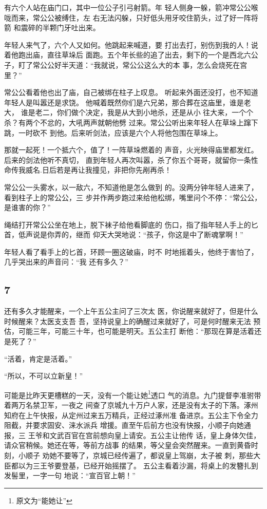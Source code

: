 有六个人站在庙门口，其中一位公子引弓射箭。年
轻人侧身一躲，箭冲常公公喉咙而来，常公公被缚住，左
右无法闪躲，只好低头用牙咬住箭头，过了好一阵将箭
和震碎的半颗门牙吐出来。

年轻人来气了，六个人又如何。他跳起来喊道，要
打出去打，别伤到我的人！说着他跑出庙，直往草垛后
面跑。五个年长些的追了出去，剩下的一个是西北六公
子，盯了常公公好半天道：“我就说，常公公这么大的本
事，怎么会烧死在宫里？”

常公公看着他也出了庙，自己被绑在柱子上叹息。
听起来外面还没打，也不知道年轻人是叫嚣还是求饶。
他喊着既然你们是六兄弟，那合葬在这庙里，谁是老大，
谁是老二，你们做个决定，我是从大到小地杀，还是从小
往大来，一个个杀？有两个不忿的，大吼两声就朝他劈
过来。常公公听出来年轻人在草垛上蹿下跳，一时砍不
到他。后来听剑法，应该是六个人将他包围在草垛上。

那就一起死！一个抵六个，值了！一阵草垛燃着的
声音，火光映得庙里都发红。后来的剑法他听不真切，
直到年轻人再次叫嚣，杀了你五个哥哥，就留你一条性
命传我威名.日后若是再让我撞见，非把你先剐再杀！

常公公一头雾水，以一敌六，不知道他是怎么做到
的。没两分钟年轻人进来了，看到柱子上的常公公，三
步并作两步跑过来给他松绑，嘴里问个不停：“常公公，
是谁害的你？”

绳结打开常公公坐在地上，脱下袜子给他看脚底的
伤口，指了指年轻人手上的匕首，低声说是你弄的，继而
仰天大哭地说：“孩子，你这是中了断魂掌啊！”

年轻人看了看手上的匕首，环顾一圈这破庙，时不
时地摇着头，他终于害怕了，几乎哭出来的声音问：“我
还有多久？”
\newline

{\centering\subsection{7}}

还有多久才能醒来，一个上午五公主问了三次太
医，你说醒来就好了，但是什么时候醒来？太医支支吾
吾，坚持说皇上的确醒过来就好了，可是何时醒来无法
预估，可能三年，可能三十年，也可能是明天。五公主打
断他：“那现在算是活着还是死了？”

“活着，肯定是活着。”

“所以，不可以立新皇！”

可能是比昨天更槽糕的一天，没有一个能让她\footnote{原文为“能她让”}透口
气的消息。九门提督李准驸带着两万名禁卫军，一夜之
间查了京城九十万户人家，还是没有太子的下落。涿州
知府在上午快报，从定州过来五万精兵，正经过涿州准
备进京。五公主下令全力阻截，并要求固安、涞水派兵
增援。直至午后前方也没有快报，小顺子向她通报，三
王爷和文武百官在宫前想向皇上请安。五公主让他传
话，皇上身体欠佳，请众官稍候。她还在等，等前方战事
的结果，等父皇会突然醒来。一直到黄昏时刻，小顺子
劝她不要等了，京城已经传遍了，都说皇上驾崩，太子被
刺，那些大臣都以为三王爷要登基，已经开始摇摆了。
五公主看着沙漏，将桌上的发簪扎到发髻里，一字一句
地说：“宣百官上朝！”

